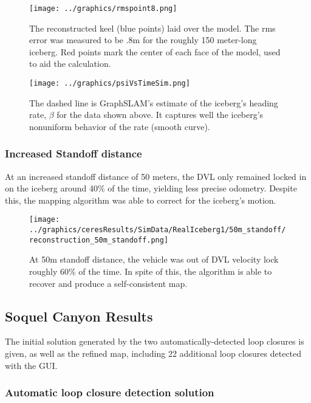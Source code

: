  \begin{figure}[!htb]
   \centering
   \texttt{[image: ../graphics/rmspoint8.png]} %
   \caption{The reconstructed keel (blue points) laid over the model. The rms error was measured to be .8m for the roughly 150 meter-long iceberg. Red points mark the center of each face of the model, used to aid the calculation.}
   \label{fig:RMS}
\end{figure}

 \begin{figure}[!htb]
   \centering
   \texttt{[image: ../graphics/psiVsTimeSim.png]} %
   \caption{The dashed line is GraphSLAM's estimate of the iceberg's heading rate, $\beta$ for the data shown above. It captures well the iceberg's nonuniform behavior of the rate (smooth curve).}
   \label{fig:PsiEst}
\end{figure}

\subsubsection{Increased Standoff distance}

At an increased standoff distance of 50 meters, the DVL only remained locked in on the iceberg around 40\% of the time, yielding less precise odometry. Despite this, the mapping algorithm was able to correct for the iceberg's motion.

 \begin{figure}[!htb]
   \centering
   \texttt{[image: ../graphics/ceresResults/SimData/RealIceberg1/50m\_standoff/reconstruction\_50m\_standoff.png]} %
   \caption{At 50m standoff distance, the vehicle was out of DVL velocity lock roughly 60\% of the time. In spite of this, the algorithm is able to recover and produce a self-consistent map.}
   \label{fig:FullSim50m}
\end{figure}

\subsection{Soquel Canyon Results}

The initial solution generated by the two automatically-detected loop closures is given, as well as the refined map, including 22 additional loop closures detected with the GUI.

\subsubsection{Automatic loop closure detection solution}


